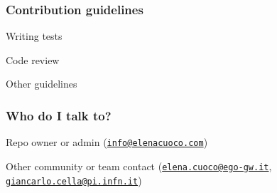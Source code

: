 \subsubsection*{Contribution guidelines}


\begin{DoxyItemize}
\item Writing tests
\item Code review
\item Other guidelines
\end{DoxyItemize}

\subsubsection*{Who do I talk to?}


\begin{DoxyItemize}
\item Repo owner or admin (\href{mailto:info@elenacuoco.com}{\tt info@elenacuoco.\+com})
\item Other community or team contact (\href{mailto:elena.cuoco@ego-gw.it}{\tt elena.\+cuoco@ego-\/gw.\+it}, \href{mailto:giancarlo.cella@pi.infn.it}{\tt giancarlo.\+cella@pi.\+infn.\+it}) 
\end{DoxyItemize}